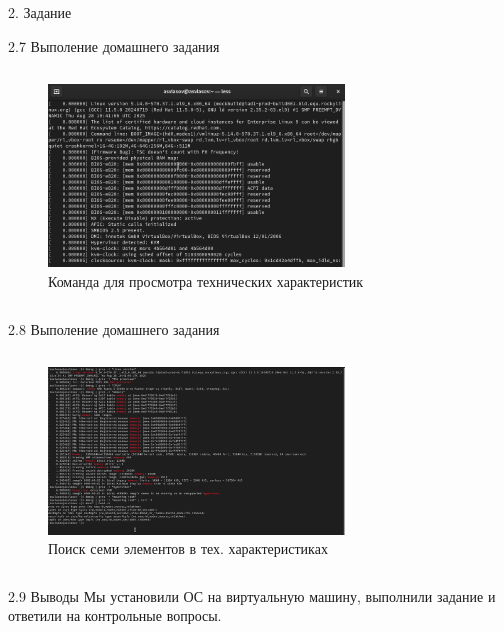 \documentclass[
  ignorenonframetext,
  aspectratio=169,
]{beamer}
\begin{document}
\begin{frame}{2. Задание}
\begin{block}{2.7 Выполение домашнего задания}
\begin{columns}[c]
\begin{figure}
{\centering \includegraphics[width=0.7\textwidth,height=\textheight]{image/16.png}

}

\caption{Команда для просмотра технических характеристик}

\end{figure}%
\end{columns}
\end{block}

\begin{block}{2.8 Выполение домашнего задания}
\label{ux432ux44bux43fux43eux43bux435ux43dux438ux435-ux434ux43eux43cux430ux448ux43dux435ux433ux43e-ux437ux430ux434ux430ux43dux438ux44f-1}
\begin{columns}[c]
\begin{figure}

{\centering \includegraphics[width=0.7\textwidth,height=\textheight]{image/17.png}

}

\caption{Поиск семи элементов в тех. характеристиках}

\end{figure}%
\end{columns}
\end{block}

\begin{block}{2.9 Выводы}
\label{ux432ux44bux432ux43eux434ux44b}
Мы установили ОС на виртуальную машину, выполнили задание и ответили на
контрольные вопросы.
\end{block}
\end{frame}
\end{document}

